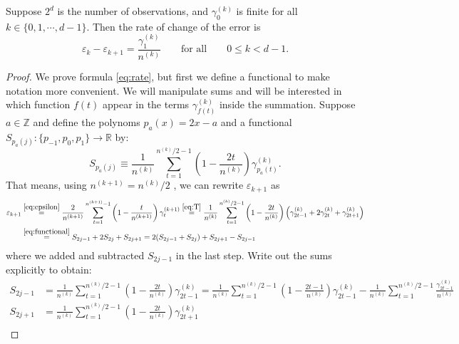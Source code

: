 \documentclass[11pt,english,a4paper]{article}
\begin{document}
\begin{prop*}
Suppose $2^d$ is the number of observations, and $\gamma^{(k)}_0$ is finite for all $k \in \{ 0,1,\cdots, d-1 \}$. Then the rate of change of the error is
\begin{equation}
\varepsilon_k - \varepsilon_{  k+1} = \frac{\gamma_1^{(k)} }{n^{(k)}} \qquad \text{for all} \qquad 0 \leq k < d-1 \label{eq:rate}.
\end{equation}
\label{prop:diff}
\end{prop*}
\begin{proof}
We prove formula \eqref{eq:rate}, but first we define a functional to make notation more convenient. We will manipulate sums and will be interested in which function $f(t)$ appear in the terms $\gamma^{(k)}_{f(t)}$ inside the summation. Suppose $a \in \mathbb{Z}$ and define the polynoms $p_{a}(x) = 2x-a$ and a functional $S_{p_a(j)} : \{p_{-1},p_{0},p_{1}\} \to \mathbb{R}$ by: 
\begin{equation}
S_{p_a(j)} \equiv \frac{1}{n^{(k)}} \sum_{t=1}^{n^{(k)}/2-1} \left( 1 - \frac{2t}{n^{(k)}} \right) \gamma^{(k)}_{p_a(t)}. \label{eq:functional}
\end{equation}
That means, using $n^{(k+1)} = n^{(k)}/2$ , we can rewrite $\varepsilon_{  k+1}$ as
\begin{align}
\varepsilon_{  k+1} &\stackrel{\eqref{eq:epsilon}}{=} \frac{2}{n^{(k+1)}} \sum_{t=1}^{n^{(k+1)}-1} \left( 1 - \frac{t}{n^{(k+1)}} \right) \gamma^{(k+1)}_t \stackrel{\eqref{eq:T}}{=} \frac{1}{n^{(k)}} \sum_{t=1}^{n^{(k)}/2-1} \left( 1 - \frac{2t}{n^{(k)}} \right) \left( \gamma^{(k)}_{2t - 1} + 2\gamma^{(k)}_{2t} + \gamma^{(k)}_{2t + 1}\right) \nonumber \\
& \stackrel{\eqref{eq:functional}} {=} S_{2j-1} + 2S_{2j} + S_{2j+1} = 2(S_{2j-1} + S_{2j}) + S_{2j+1} - S_{2j-1} \label{eq:epsilonkpp}
\end{align}
where we added and subtracted $S_{2j - 1}$ in the last step. Write out the sums explicitly to obtain:
\begin{align}
S_{2j-1} &= \frac{1}{n^{(k)}} \sum_{t=1}^{n^{(k)}/2-1} \left( 1 - \frac{2t}{n^{(k)}} \right) \gamma^{(k)}_{2t - 1}  = \frac{1}{n^{(k)}}\sum_{t=1}^{n^{(k)}/2-1} \left( 1 - \frac{2t-1}{n^{(k)}}\right) \gamma^{(k)}_{2t - 1} - \frac{1}{n^{(k)}} \sum_{t=1}^{n^{(k)}/2-1} \frac{\gamma^{(k)}_{2t - 1}}{n^{(k)}} \label{eq:sumB}
\\
S_{2j+1} &= \frac{1}{n^{(k)}} \sum_{t=1}^{n^{(k)}/2-1} \left( 1 - \frac{2t}{n^{(k)}} \right) \gamma^{(k)}_{2t + 1} \nonumber  \\

\end{align}
\end{proof}
\end{document}
